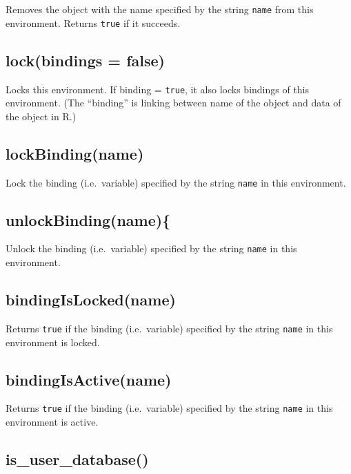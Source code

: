 \documentclass[
]{book}
\begin{document}
Removes the object with the name specified by the string \texttt{name} from this environment. Returns \texttt{true} if it succeeds.

\hypertarget{lockbindings-false}{%
\subsection{lock(bindings = false)}\label{lockbindings-false}}

Locks this environment. If binding = \texttt{true}, it also locks bindings of this environment. (The ``binding'' is linking between name of the object and data of the object in R.)

\hypertarget{lockbindingname}{%
\subsection{lockBinding(name)}\label{lockbindingname}}

Lock the binding (i.e.~variable) specified by the string \texttt{name} in this environment.

\hypertarget{unlockbindingname}{%
\subsection{unlockBinding(name)\{}\label{unlockbindingname}}

Unlock the binding (i.e.~variable) specified by the string \texttt{name} in this environment.

\hypertarget{bindingislockedname}{%
\subsection{bindingIsLocked(name)}\label{bindingislockedname}}

Returns \texttt{true} if the binding (i.e.~variable) specified by the string \texttt{name} in this environment is locked.

\hypertarget{bindingisactivename}{%
\subsection{bindingIsActive(name)}\label{bindingisactivename}}

Returns \texttt{true} if the binding (i.e.~variable) specified by the string \texttt{name} in this environment is active.

\hypertarget{is_user_database}{%
\subsection{is\_user\_database()}\label{is_user_database}}
\end{document}
